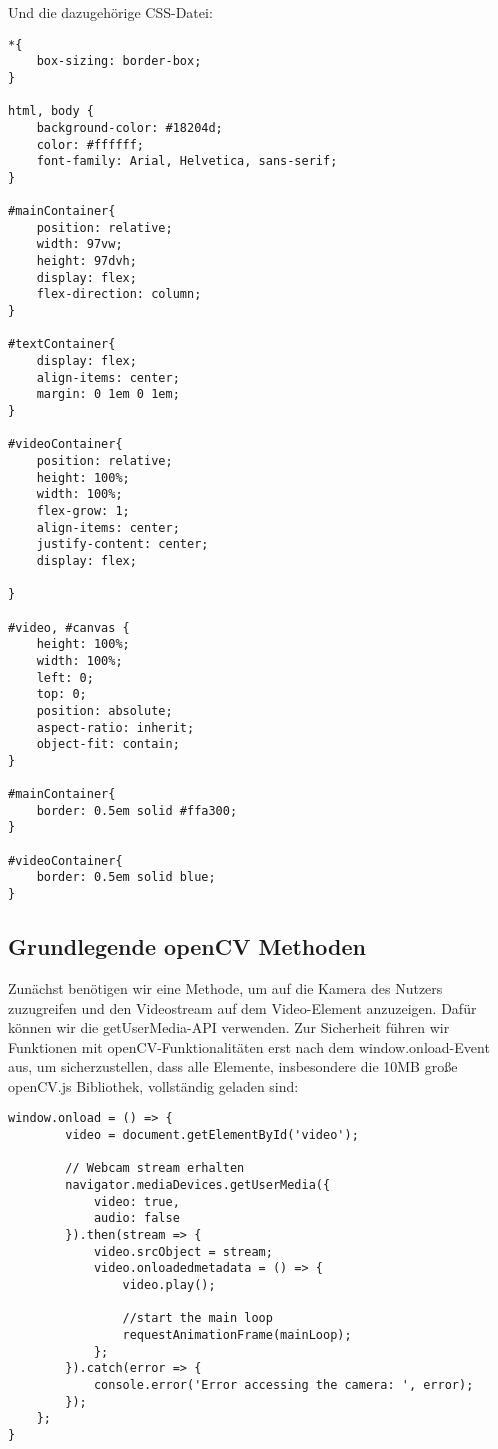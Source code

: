 \documentclass{article}
\begin{document}
Und die dazugehörige CSS-Datei:

\begin{lstlisting}[style=CSS]
*{
    box-sizing: border-box;
}

html, body {
    background-color: #18204d;
    color: #ffffff;
    font-family: Arial, Helvetica, sans-serif;
}

#mainContainer{
    position: relative;
    width: 97vw;
    height: 97dvh;
    display: flex;
    flex-direction: column;
}

#textContainer{
    display: flex;
    align-items: center;
    margin: 0 1em 0 1em;
}

#videoContainer{
    position: relative;
    height: 100%;
    width: 100%;
    flex-grow: 1;
    align-items: center;
    justify-content: center;
    display: flex;

}

#video, #canvas {
    height: 100%;
    width: 100%;
    left: 0;
    top: 0;
    position: absolute;
    aspect-ratio: inherit;
    object-fit: contain;
}

#mainContainer{
    border: 0.5em solid #ffa300;
}

#videoContainer{
    border: 0.5em solid blue;
}
\end{lstlisting}

\subsection{Grundlegende openCV Methoden}
Zunächst benötigen wir eine Methode, um auf die Kamera des Nutzers zuzugreifen und den Videostream auf dem Video-Element anzuzeigen. Dafür können wir die getUserMedia-API verwenden. Zur Sicherheit führen wir Funktionen mit openCV-Funktionalitäten erst nach dem window.onload-Event aus, um sicherzustellen, dass alle Elemente, insbesondere die 10MB große openCV.js Bibliothek, vollständig geladen sind:

\begin{lstlisting}[style=JavaScript]
    window.onload = () => {
        video = document.getElementById('video');
    
        // Webcam stream erhalten
        navigator.mediaDevices.getUserMedia({
            video: true,
            audio: false
        }).then(stream => {
            video.srcObject = stream;
            video.onloadedmetadata = () => {
                video.play();

                //start the main loop
                requestAnimationFrame(mainLoop);
            };
        }).catch(error => {
            console.error('Error accessing the camera: ', error);
        });
    };
}
\end{lstlisting}
\end{document}
